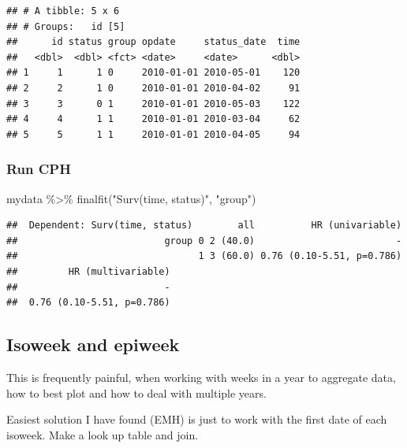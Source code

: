 \documentclass[
]{book}
\newenvironment{Shaded}{\begin{snugshade}}{\end{snugshade}}
\newcommand{\FunctionTok}[1]{\textcolor[rgb]{0.00,0.00,0.00}{#1}}
\newcommand{\NormalTok}[1]{#1}
\newcommand{\SpecialCharTok}[1]{\textcolor[rgb]{0.00,0.00,0.00}{#1}}
\newcommand{\StringTok}[1]{\textcolor[rgb]{0.31,0.60,0.02}{#1}}
\begin{document}
\begin{verbatim}
## # A tibble: 5 x 6
## # Groups:   id [5]
##      id status group opdate     status_date  time
##   <dbl>  <dbl> <fct> <date>     <date>      <dbl>
## 1     1      1 0     2010-01-01 2010-05-01    120
## 2     2      1 0     2010-01-01 2010-04-02     91
## 3     3      0 1     2010-01-01 2010-05-03    122
## 4     4      1 1     2010-01-01 2010-03-04     62
## 5     5      1 1     2010-01-01 2010-04-05     94
\end{verbatim}

\hypertarget{run-cph}{%
\subsubsection{Run CPH}\label{run-cph}}

\begin{Shaded}
\begin{Highlighting}[]
\NormalTok{mydata }\SpecialCharTok{\%\textgreater{}\%} 
  \FunctionTok{finalfit}\NormalTok{(}\StringTok{"Surv(time, status)"}\NormalTok{, }\StringTok{"group"}\NormalTok{)}
\end{Highlighting}
\end{Shaded}

\begin{verbatim}
##  Dependent: Surv(time, status)        all          HR (univariable)
##                          group 0 2 (40.0)                         -
##                                1 3 (60.0) 0.76 (0.10-5.51, p=0.786)
##         HR (multivariable)
##                          -
##  0.76 (0.10-5.51, p=0.786)
\end{verbatim}

\hypertarget{isoweek-and-epiweek}{%
\subsection{Isoweek and epiweek}\label{isoweek-and-epiweek}}

This is frequently painful, when working with weeks in a year to aggregate data, how to best plot and how to deal with multiple years.

Easiest solution I have found (EMH) is just to work with the first date of each isoweek. Make a look up table and join.
\end{document}
